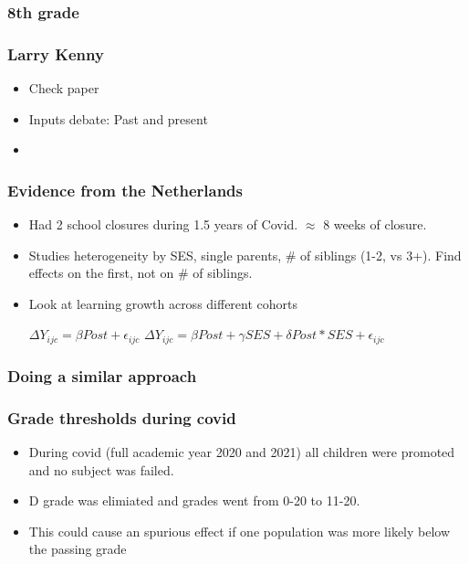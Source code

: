 \documentclass{beamer}
\begin{document}
\begin{frame}
    \label{update_scott}
    \frametitle{8th grade}
        {
    }
\end{frame}


\begin{frame}
    \label{update_scott}
    \frametitle{Larry Kenny}
    \begin{itemize}
        \item Check paper
        \item Inputs debate: Past and present
        \item 
    \end{itemize}
\end{frame}

\begin{frame}
    \label{event_cohort_m}
    \frametitle{Evidence from the Netherlands}
    \begin{itemize}
        \item Had 2 school closures during 1.5 years of Covid. $\approx$ 8 weeks of closure.
        \item Studies heterogeneity by SES, single parents, # of siblings (1-2, vs 3+). Find effects on the first, not on # of siblings.
        \item Look at learning growth across different cohorts
   
       $\Delta Y_{ijc}= \beta Post + \epsilon_{ijc}$ 
       $\Delta Y_{ijc}= \beta Post + \gamma SES + \delta Post*SES + \epsilon_{ijc}$ 
     \end{itemize}
\end{frame}

\begin{frame}
    \label{event_cohort_m}
    \frametitle{Doing a similar approach}
        {\resizebox{0.9\textwidth}{!}{
      }
    }
\end{frame}


\begin{frame}
    \label{update_scott}
    \frametitle{Grade thresholds during covid}
    \begin{itemize}
        \item During covid (full academic year 2020 and 2021) all children were promoted and no subject was failed. 
        \item D grade was elimiated and grades went from 0-20 to 11-20.
        \item This could cause an spurious effect if one population was more likely below the passing grade
    \end{itemize}
\end{frame}
\end{document}
